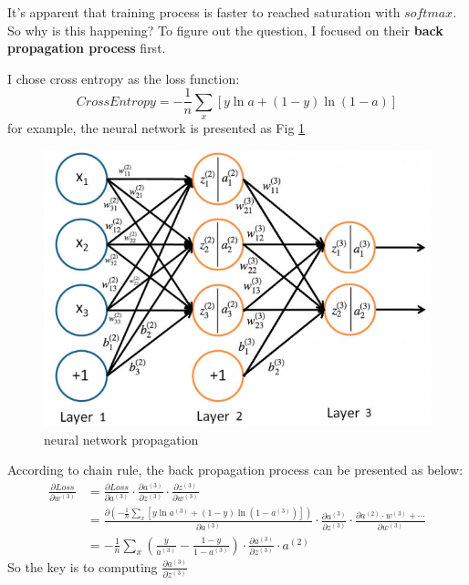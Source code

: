 \documentclass[a4paper,10pt]{article}
\begin{document}
It's apparent that training process is faster to reached saturation with $softmax$. So why is this happening? To figure out the question, I focused on their \textbf{back propagation process} first. 

I chose cross entropy as the loss function:
\[
CrossEntropy=-\frac{1}{n} \sum_{x}[y \ln a+(1-y) \ln (1-a)]
\] 
for example, the neural network is presented as Fig \ref{Fig.backpropagation}
\begin{figure}[htpb]
\centering 
\includegraphics[width=1\textwidth]{report_image/backpropagation.jpg} 
\caption{neural network propagation} 
\label{Fig.backpropagation} 
\end{figure}

According to chain rule, the back propagation process can be presented as below:
\begin{equation*}
    \begin{split}
    \frac{\partial Loss}{\partial w^{(3)}} &= \frac{\partial Loss}{\partial a^{(3)}} \cdot \frac{\partial a^{(3)}}{\partial z^{(3)}} \cdot \frac{\partial z^{(3)}}{\partial w^{(3)}} \\
    &= \frac{\partial (-\frac{1}{n} \sum_{x}[y \ln a^{(3)}+(1-y) \ln (1-a^{(3)})])}{\partial a^{(3)}} \cdot \frac{\partial a^{(3)}}{\partial z^{(3)}} \cdot \frac{\partial a^{(2)} \cdot w^{(3)} + \cdots}{\partial w^{(3)}} \\
    &= -\frac{1}{n}\sum_{x}(\frac{y}{a^{(3)}}-\frac{1-y}{1-a^{(3)}}) \cdot \frac{\partial a^{(3)}}{\partial z^{(3)}} \cdot a^{(2)}
    \end{split}
\end{equation*}
So the key is to computing $\frac{\partial a^{(3)}}{\partial z^{(3)}}$
\end{document}
